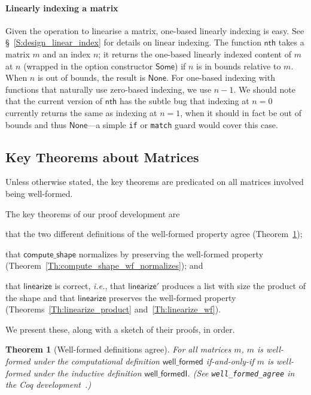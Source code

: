 \documentclass[11pt,conference]{IEEEtran}
\newcommand{\func}[1]{\mathsf{#1}}
\theoremstyle{plain} %
\newtheorem{thm}{Theorem}[section]
\theoremstyle{definition}
\theoremstyle{remark}
\begin{document}
\paragraph{Linearly indexing a matrix} Given the operation to linearise a
matrix, one-based linearly indexing is easy. See \S~\ref{S:design_linear_index}
for details on linear indexing. The function \(\func{nth}\) takes a matrix \(m\)
and an index \(n\); it returns the one-based linearly indexed content of \(m\)
at \(n\) (wrapped in the option constructor \(\func{Some}\)) if \(n\) is in
bounds relative to \(m\). When \(n\) is out of bounds, the result is
\(\func{None}\). For one-based indexing with functions that naturally use
zero-based indexing, we use \(n-1\). We should note that the current version of
\(\func{nth}\) has the subtle bug that indexing at \(n=0\) currently returns the
same as indexing at \(n=1\), when it should in fact be out of bounds and thus
\(\func{None}\)---a simple \texttt{if} or \texttt{match} guard would cover this
case.

\subsection{Key Theorems about Matrices}\label{S:matrix_thm}

Unless otherwise stated, the key theorems are predicated on all matrices
involved being well-formed.

The key theorems of our proof development are
\begin{inlist}
\item that the two different definitions of the well-formed property agree
    (Theorem~\ref{Th:well_formed_agree});
\item that \(\func{compute\_shape}\) normalizes by preserving the well-formed
    property (Theorem~\ref{Th:compute_shape_wf_normalizes}); and
\item that \(\func{linearize}\) is correct, \textit{i.e.}, that
    \(\func{linearize'}\) produces a list with size the product of the shape and
    that \(\func{linearize}\) preserves the well-formed property
    (Theorems~\ref{Th:linearize_product} and~\ref{Th:linearize_wf}).
\end{inlist}
We present these, along with a sketch of their proofs, in order.

\begin{thm}[Well-formed definitions agree]\label{Th:well_formed_agree}
    For all matrices \(m\), \(m\) is well-formed under the computational
    definition \(\func{well\_formed}\) if-and-only-if \(m\) is well-formed under
    the inductive definition \(\func{well\_formedI}\). (See
    \texttt{well\_formed\_agree} in the Coq
    development~\cite{zelda_mosaic_proof}.)
\end{thm}
\end{document}
